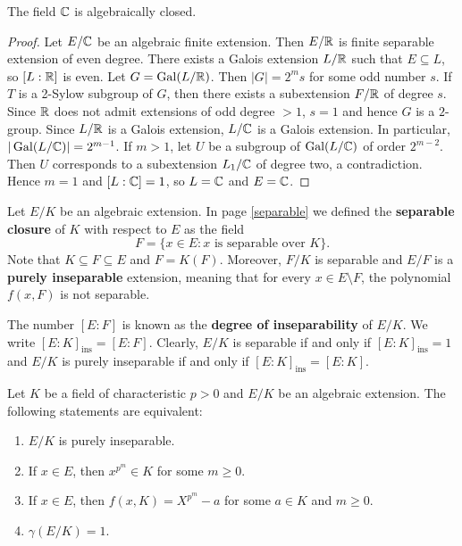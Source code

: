 \begin{theorem}
The field $\mathbb{C}$ is algebraically closed.
\end{theorem}

\begin{proof}
    Let $E/\mathbb{C}$ be an algebraic finite extension. Then $E/\mathbb{R}$ 
    is finite separable extension of even degree. There exists a Galois
    extension 
    $L/\mathbb{R}$ such that $E\subseteq L$, so $[L:\mathbb{R}]$ is even. Let $G=\operatorname{Gal}(L/\mathbb{R})$. 
    Then $|G|=2^ms$ for some odd number $s$. If $T$ is a 2-Sylow subgroup
    of $G$, 
    then there exists a subextension $F/\mathbb{R}$ of degree $s$. Since 
    $\mathbb{R}$ does not admit extensions of odd degree $>1$, $s=1$ and
    hence $G$ is a $2$-group. Since 
    $L/\mathbb{R}$ is a Galois extension, $L/\mathbb{C}$ is a Galois extension. 
    In particular, $|\operatorname{Gal}(L/\mathbb{C})|=2^{m-1}$. If $m>1$, 
    let $U$ be a subgroup of $\operatorname{Gal}(L/\mathbb{C})$ of order $2^{m-2}$. Then $U$ corresponds 
    to a subextension $L_1/\mathbb{C}$ of degree two, a contradiction. Hence $m=1$ 
    and $[L:\mathbb{C}]=1$, so $L=\mathbb{C}$ and $E=\mathbb{C}$. 
\end{proof}


Let $E/K$ be an algebraic extension. 
In page \ref{separable} we defined the 
\textbf{separable closure} of $K$ with respect to $E$ as 
the field 
\[
    F=\{x\in E:x\text{ is separable over }K\}.
\]
Note that $K\subseteq F\subseteq E$ 
and $F=K(F)$. Moreover, 
$F/K$ is separable and 
$E/F$ is a \textbf{purely inseparable} extension, meaning that
for every $x\in E\setminus F$, the polynomial $f(x,F)$ is not separable. 

The number $[E:F]$ is known as the \textbf{degree of inseparability} of $E/K$. 
We write $[E:K]_{\operatorname{ins}}=[E:F]$.
Clearly, $E/K$ is separable if and only if $[E:K]_{\operatorname{ins}}=1$ and 
$E/K$ is purely inseparable if and only if $[E:K]_{\operatorname{ins}}=[E:K]$. 

\begin{proposition}
Let $K$ be a field of characteristic $p>0$ and
$E/K$ be an algebraic extension. The following statements are equivalent:
\begin{enumerate}
    \item $E/K$ is purely inseparable.
    \item If $x\in E$, then $x^{p^m}\in K$ for some $m\geq0$.
    \item If $x\in E$, then $f(x,K)=X^{p^m}-a$ for some $a\in K$ and $m\geq0$. 
    \item $\gamma(E/K)=1$. 
\end{enumerate}
\end{proposition}

